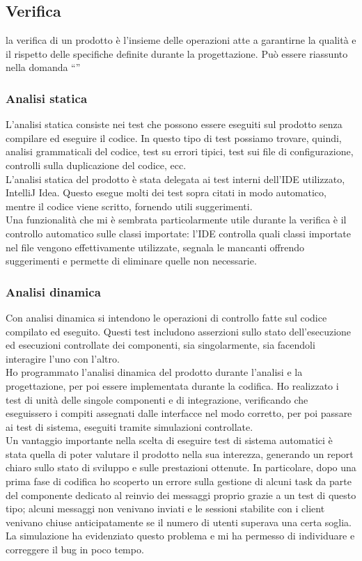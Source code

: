 	\subsection{Verifica}
	la verifica di un prodotto è l'insieme delle operazioni atte a garantirne la qualità e il rispetto delle specifiche definite durante la progettazione. Può essere riassunto nella domanda ``''
		\subsubsection{Analisi statica}
		L'analisi statica consiste nei test che possono essere eseguiti sul prodotto senza compilare ed eseguire il codice. In questo tipo di test possiamo trovare, quindi, analisi grammaticali del codice, test su errori tipici, test sui file di configurazione, controlli sulla duplicazione del codice, ecc.
		\\
		L'analisi statica del prodotto è stata delegata ai test interni dell'IDE utilizzato, IntelliJ Idea. Questo esegue molti dei test sopra citati in modo automatico, mentre il codice viene scritto, fornendo utili suggerimenti.
		\\
		Una funzionalità che mi è sembrata particolarmente utile durante la verifica è il controllo automatico sulle classi importate: l'IDE controlla quali classi importate nel file vengono effettivamente utilizzate, segnala le mancanti offrendo suggerimenti e permette di eliminare quelle non necessarie.

		\subsubsection{Analisi dinamica}
		Con analisi dinamica si intendono le operazioni di controllo fatte sul codice compilato ed eseguito. Questi test includono asserzioni sullo stato dell'esecuzione ed esecuzioni controllate dei componenti, sia singolarmente, sia facendoli interagire l'uno con l'altro.
		\\
		Ho programmato l'analisi dinamica del prodotto durante l'analisi e la progettazione, per poi essere implementata durante la codifica. Ho realizzato i test di unità delle singole componenti e di integrazione, verificando che eseguissero i compiti assegnati dalle interfacce nel modo corretto, per poi passare ai test di sistema, eseguiti tramite simulazioni controllate.
		\\
		Un vantaggio importante nella scelta di eseguire test di sistema automatici è stata quella di poter valutare il prodotto nella sua interezza, generando un report chiaro sullo stato di sviluppo e sulle prestazioni ottenute. In particolare, dopo una prima fase di codifica ho scoperto un errore sulla gestione di alcuni task da parte del componente dedicato al reinvio dei messaggi proprio grazie a un test di questo tipo; alcuni messaggi non venivano inviati e le sessioni stabilite con i client venivano chiuse anticipatamente se il numero di utenti superava una certa soglia. La simulazione ha evidenziato questo problema e mi ha permesso di individuare e correggere il bug in poco tempo.

